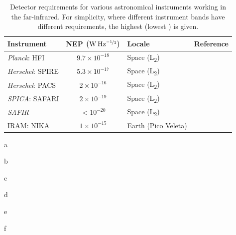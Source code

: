 \begin{table}[tb]
\caption[Detector requirements for various astronomical instruments working in the far-infrared]{Detector requirements for various astronomical instruments working in the far-infrared. For simplicity, where different instrument bands have different requirements, the highest (lowest ) is given.} 
\label{tab:detectorRequirements}
\centering
\begin{threeparttable}
\begin{tabular}{lclc}
\toprule\toprule
Instrument & {NEP $\left(\mathrm{W\,Hz^{\nicefrac{-1}{2}}}\right)$} & Locale & Reference\\ \midrule
\textit{Planck}: HFI & $9.7\times 10^{-18}$ & Space (L\textsubscript{2}) & \tnote{a}  \\
\textit{Herschel}: SPIRE & $5.3\times 10^{-17}$ & Space (L\textsubscript{2}) & \tnote{b}\\
\textit{Herschel}: PACS & $2\times 10^{-16}$ & Space (L\textsubscript{2}) & \tnote{c} \\
\textit{SPICA}: SAFARI & $2\times 10^{-19}$ & Space (L\textsubscript{2}) & \tnote{d} \\
\textit{SAFIR} & $< 10^{-20}$ & Space (L\textsubscript{2}) & \tnote{e} \\
IRAM: NIKA & $1\times 10^{-15}$ & Earth (Pico Veleta) & \tnote{f} \\
\bottomrule
\end{tabular}
\begin{tablenotes}
\item[a] \textcite{Lamarre2010}
\item[b] \textcite{Griffin2006}
\item[c] \textcite{Poglitsch2008}
\item[d] \textcite{Jackson2012}
\item[e] \textcite{Leisawitz2004}
\item[f] \textcite{Monfardini2010}
\end{tablenotes}
\end{threeparttable}
\end{table}
%
